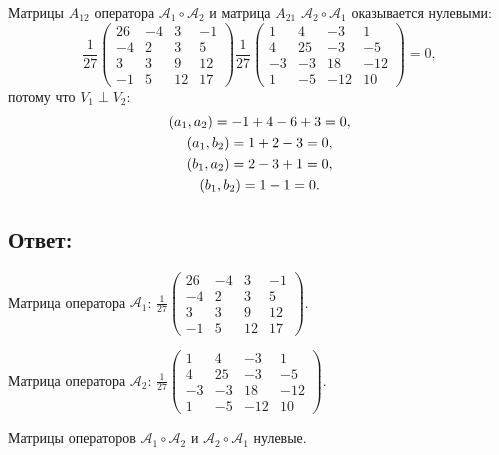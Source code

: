\documentclass[12pt]{article}
\begin{document}
    Матрицы $A_{12}$ оператора $\mathcal{A}_1 \circ \mathcal{A}_2$ и матрица $A_{21}$ $\mathcal{A}_2 \circ \mathcal{A}_1$ оказывается нулевыми:
    \[
        \frac{1}{27}
        \begin{pmatrix}
            26 & -4 & 3  & -1 \\
            -4 & 2  & 3  & 5  \\
            3  & 3  & 9  & 12 \\
            -1 & 5  & 12 & 17
        \end{pmatrix}
        \frac{1}{27}
        \begin{pmatrix}
            1  & 4  & -3  & 1   \\
            4  & 25 & -3  & -5  \\
            -3 & -3 & 18  & -12 \\
            1  & -5 & -12 & 10
        \end{pmatrix}
        = 0 ,
    \]
    потому что $V_1 \perp V_2$:
    \begin{gather*}
        \left ( a_1, a_2 \right ) = -1 + 4 - 6 + 3 = 0, \\
        \left ( a_1, b_2 \right ) = 1 + 2 - 3 = 0, \\
        \left ( b_1, a_2 \right ) = 2 - 3 + 1 = 0, \\
        \left ( b_1, b_2 \right ) = 1 - 1 = 0 .
    \end{gather*}

    \subsection*{Ответ:}
    Матрица оператора $\mathcal{A}_1$:
    $
    \frac{1}{27}
    \begin{pmatrix}
        26 & -4 & 3  & -1 \\
        -4 & 2  & 3  & 5  \\
        3  & 3  & 9  & 12 \\
        -1 & 5  & 12 & 17
    \end{pmatrix}
    $.

    Матрица оператора $\mathcal{A}_2$:
    $
    \frac{1}{27}
    \begin{pmatrix}
        1  & 4  & -3  & 1   \\
        4  & 25 & -3  & -5  \\
        -3 & -3 & 18  & -12 \\
        1  & -5 & -12 & 10
    \end{pmatrix}
    $.

    Матрицы операторов $\mathcal{A}_1 \circ \mathcal{A}_2$ и $\mathcal{A}_2 \circ \mathcal{A}_1$ нулевые.
\end{document}
